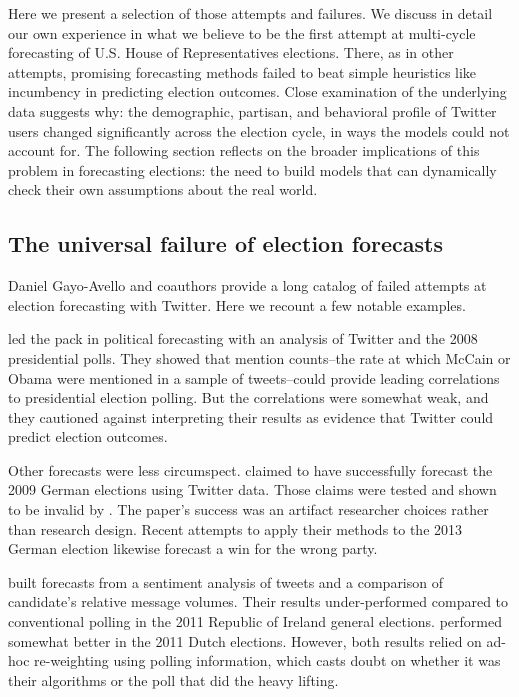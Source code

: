 \documentclass{article}
\begin{document}
Here we present a selection of those attempts and failures. We discuss
in detail our own experience in what we believe to be the first
attempt at multi-cycle forecasting of U.S. House of Representatives
elections. There, as in other attempts, promising forecasting methods
failed to beat simple heuristics like incumbency in predicting
election outcomes. Close examination of the underlying data suggests
why: the demographic, partisan, and behavioral profile of Twitter
users changed significantly across the election cycle, in ways the
models could not account for. The following section reflects on the
broader implications of this problem in forecasting elections: the
need to build models that can dynamically check their own assumptions
about the real world. 

\subsection{The universal failure of election forecasts}
\label{sec:univ-fail-elect}

Daniel Gayo-Avello and coauthors \citep{gayo2011limits,metaxas2011not}
provide a long catalog of failed attempts at election forecasting with
Twitter. Here we recount a few notable examples. 

\cite{o2010tweets} led the pack in political forecasting with an
analysis of Twitter and the 2008 presidential polls. They showed that
mention counts--the rate at which McCain or Obama were mentioned in a
sample of tweets--could provide leading correlations to presidential
election polling. But the correlations were somewhat weak, and they
cautioned against interpreting their results as evidence that Twitter
could predict election outcomes.

Other forecasts were less circumspect. \cite{tumasjan2010election}
claimed to have successfully forecast the 2009 German elections using
Twitter data. Those claims were tested and shown to be invalid by
\cite{jungherr2012pirate}. The paper's success was an artifact
researcher choices rather than research design. Recent attempts to
apply their methods to the 2013 German election likewise forecast a
win for the wrong party.

\cite{bermingham2011using} built forecasts from a sentiment analysis
of tweets and a comparison of candidate's relative message
volumes. Their results under-performed compared to conventional
polling in the 2011 Republic of Ireland general
elections. \cite{sang2012predicting} performed somewhat better in the
2011 Dutch elections. However, both results relied on ad-hoc
re-weighting using polling information, which casts doubt on whether
it was their algorithms or the poll that did the heavy lifting.
\end{document}
